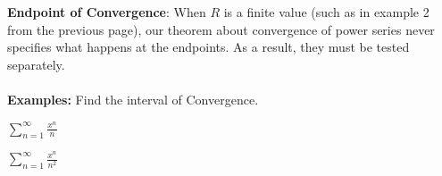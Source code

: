 \newpage


\noindent\textbf{Endpoint of Convergence}: When $R$ is a finite value (such as in example 2 from the previous page), our theorem about convergence of power series never specifies what happens at the endpoints. As a result, they must be tested separately.\\
\\
\noindent\textbf{Examples:} Find the interval of Convergence.
\begin{questions}
    \question $\displaystyle\sum_{n=1}^{\infty}\frac{x^n}{n}$
    
    \question$\displaystyle\sum_{n=1}^{\infty}\frac{x^n}{n^2}$
\end{questions}

\newpage


